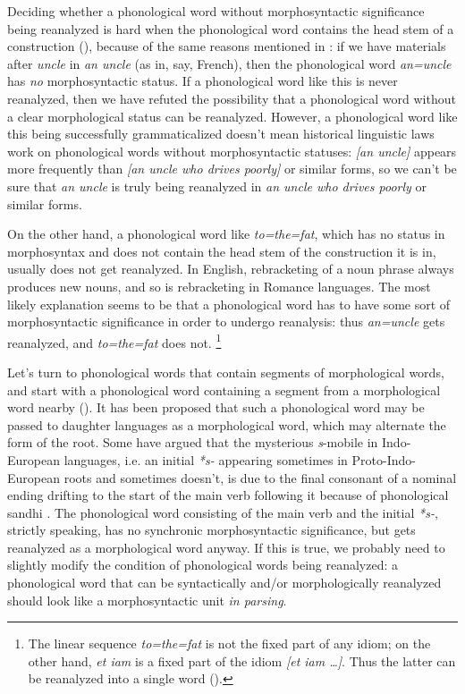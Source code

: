 \documentclass[a4paper, oneside, scheme=plain, 12pt]{article}
\newcommand*{\citepage}[1]{p.~{#1}}
\newcommand{\form}[1]{\emph{#1}}
\begin{document}
Deciding whether a phonological word without morphosyntactic significance being reanalyzed is hard
when the phonological word contains the head stem of a construction (),
because of the same reasons mentioned in :
if we have materials after \form{uncle} in \form{an uncle} (as in, say, French),
then the phonological word \form{an=uncle} has \emph{no} morphosyntactic status.
If a phonological word like this is never reanalyzed,
then we have refuted the possibility that a phonological word without a clear morphological status can be reanalyzed.
However, a phonological word like this being successfully grammaticalized
doesn't mean historical linguistic laws work on phonological words without morphosyntactic statuses:
\form{[an uncle]} appears more frequently than \form{[an uncle who drives poorly]} or similar forms,
so we can't be sure that \form{an uncle} is truly being reanalyzed in \form{an uncle who drives poorly} or similar forms.

On the other hand, a phonological word like \form{to=the=fat}, which has no status in morphosyntax
and does not contain the head stem of the construction it is in,
usually does not get reanalyzed.
In English, rebracketing of a noun phrase always produces new nouns,
and so is rebracketing in Romance languages.
The most likely explanation seems to be that
a phonological word has to have some sort of morphosyntactic significance in order to undergo reanalysis:
thus \form{an=uncle} gets reanalyzed, and \form{to=the=fat} does not.%
\footnote{
    The linear sequence \form{to=the=fat} is not the fixed part of any idiom;
    on the other hand, \form{et iam} is a fixed part of the idiom \form{[et iam \dots]}.
    Thus the latter can be reanalyzed into a single word ().
}

Let's turn to phonological words that contain segments of morphological words,
and start with a phonological word containing a segment from a morphological word nearby
().
It has been proposed that such a phonological word
may be passed to daughter languages as a morphological word,
which may alternate the form of the root.
Some have argued that the mysterious \form{s}-mobile in Indo-European languages,
i.e. an initial \form{*s-} appearing sometimes in Proto-Indo-European roots and sometimes doesn't,
is due to the final consonant of a nominal ending drifting to the start of the main verb following it
because of phonological sandhi \citep[\citepage{169}]{sihler1995new}.
The phonological word consisting of the main verb and the initial \form{*s-},
strictly speaking, has no synchronic morphosyntactic significance,
but gets reanalyzed as a morphological word anyway.
If this is true, we probably need to slightly modify the condition of phonological words being reanalyzed:
a phonological word that can be syntactically and/or morphologically reanalyzed
should look like a morphosyntactic unit \emph{in parsing}.
\end{document}
